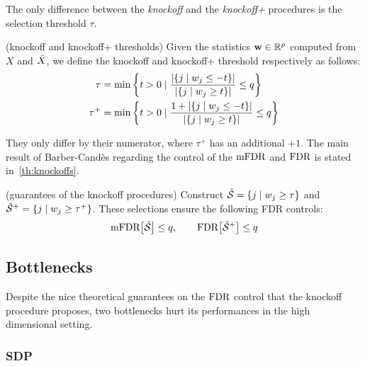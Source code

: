 The only difference between the \emph{knockoff} and the \emph{knockoff+} procedures is the selection threshold $\tau$.
\begin{definition}
    (knockoff and knockoff+ thresholds)
    Given the statistics $\mathbf{w} \in \mathbb{R}^p$ computed from $X$ and $\tilde{X}$,
    we define the knockoff and knockoff+ threshold respectively as follows:
    \begin{align}
        \tau &=
        \min\left\{
            t > 0 \mid \frac
                { \left\lvert\left\{ j \mid w_j \leq -t \right\}\right\rvert }
                { \left\lvert\left\{ j \mid w_j \geq t \right\}\right\rvert }
            \leq q
        \right\}\label{eq:knock_thres}\\
        \tau^+ &=
        \min\left\{
            t > 0 \mid \frac
                { 1 + \left\lvert\left\{ j \mid w_j \leq -t \right\}\right\rvert }
                { \left\lvert\left\{ j \mid w_j \geq t \right\}\right\rvert }
            \leq q
        \right\}\label{eq:knockp_thres}
    \end{align}
\end{definition}
They only differ by their numerator, where $\tau^+$ has an additional $+1$.
The main result of Barber-Candès regarding the control of the $\text{mFDR}$ and $\text{FDR}$ is stated in~\ref{th:knockoffs}.
\begin{theorem}\label{th:knockoffs}
    (guarantees of the knockoff procedures)
    Construct $\hat{\mathcal{S}} = \left\{ j \mid w_j \geq \tau \right\}$
    and $\hat{\mathcal{S}}^+ = \left\{ j \mid w_j \geq \tau^+ \right\}$.
    These selections ensure the following FDR controls:
    \begin{equation}
        \text{mFDR}\big[ \hat{\mathcal{S}} \big] \leq q
        ,\qquad
        \text{FDR}\big[ \hat{\mathcal{S}}^+ \big] \leq q
    \end{equation}
\end{theorem}

\subsection{Bottlenecks}\label{subsec:kb}

Despite the nice theoretical guarantees on the $\text{FDR}$ control that the knockoff procedure proposes,
two bottlenecks hurt its performances in the high dimensional setting.

\subsubsection{SDP}\label{subsubsec:bot_sdp}


